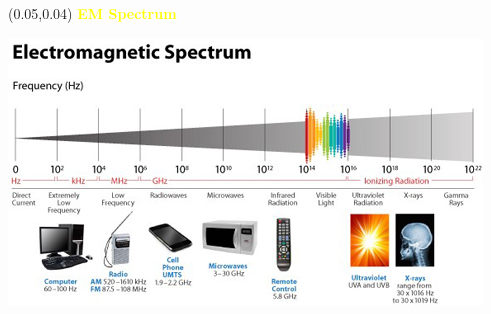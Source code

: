 \documentclass[aspectratio=169]{beamer} %
\begin{document}
\begin{frame}{}
	\setlength{\TPHorizModule}{\textwidth}
	\setlength{\TPVertModule}{\textwidth}
	\begin{textblock}{0.74}(0.05,0.04)
		\bfseries\huge\textcolor{yellow}{EM Spectrum}
	\end{textblock}
	\begin{center}
		\includegraphics[width=1.0\linewidth, height=0.75\textheight]{../images/em_spectrum.jpg}
	\end{center}
\end{frame}
\end{document}
